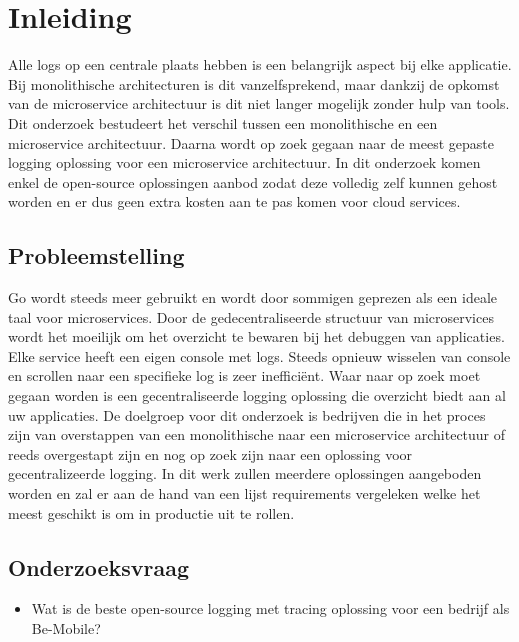 
\chapter{Inleiding}
\label{ch:inleiding}

Alle logs op een centrale plaats hebben is een belangrijk aspect bij elke applicatie. Bij monolithische architecturen is dit vanzelfsprekend, maar dankzij de opkomst van de microservice architectuur is dit niet langer mogelijk zonder hulp van tools. Dit onderzoek bestudeert het verschil tussen een monolithische en een microservice architectuur. Daarna wordt op zoek gegaan naar de meest gepaste logging oplossing voor een microservice architectuur. In dit onderzoek komen enkel de open-source oplossingen aanbod zodat deze volledig zelf kunnen gehost worden en er dus geen extra kosten aan te pas komen voor cloud services. 

\section{Probleemstelling}
\label{sec:probleemstelling}

Go wordt steeds meer gebruikt en wordt door sommigen geprezen als een ideale taal voor microservices. Door de gedecentraliseerde structuur van microservices wordt het moeilijk om het overzicht te bewaren bij het debuggen van applicaties. Elke service heeft een eigen console met logs. Steeds opnieuw wisselen van console en scrollen naar een specifieke log is zeer inefficiënt. Waar naar op zoek moet gegaan worden is een gecentraliseerde logging oplossing die overzicht biedt aan al uw applicaties. De doelgroep voor dit onderzoek is bedrijven die in het proces zijn van overstappen van een monolithische naar een microservice architectuur of reeds overgestapt zijn en nog op zoek zijn naar een oplossing voor gecentralizeerde logging. In dit werk zullen meerdere oplossingen aangeboden worden en zal er aan de hand van een lijst requirements vergeleken welke het meest geschikt is om in productie uit te rollen.

\section{Onderzoeksvraag}
\label{sec:onderzoeksvraag}

\begin{itemize}
    \item  Wat is de beste open-source logging met tracing oplossing voor een bedrijf als Be-Mobile?
\end{itemize}

